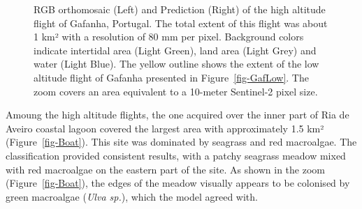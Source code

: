 \documentclass[
  number]{elsarticle}
\begin{document}
\label{cell-fig-GafHigh}
\begin{figure}[H]


\caption{\label{fig-GafHigh}RGB orthomosaic (Left) and Prediction
(Right) of the high altitude flight of Gafanha, Portugal. The total
extent of this flight was about 1 km² with a resolution of 80 mm per
pixel. Background colors indicate intertidal area (Light Green), land
area (Light Grey) and water (Light Blue). The yellow outline shows the
extent of the low altitude flight of Gafanha presented in
Figure~\ref{fig-GafLow}. The zoom covers an area equivalent to a
10-meter Sentinel-2 pixel size.}

\end{figure}%

Amoung the high altitude flights, the one acquired over the inner part
of Ria de Aveiro coastal lagoon covered the largest area with
approximately 1.5 km² (Figure~\ref{fig-Boat}). This site was dominated
by seagrass and red macroalgae. The classification provided consistent
results, with a patchy seagrass meadow mixed with red macroalgae on the
eastern part of the site. As shown in the zoom (Figure~\ref{fig-Boat}),
the edges of the meadow visually appears to be colonised by green
macroalgae (\emph{Ulva sp.}), which the model agreed with.
\end{document}
